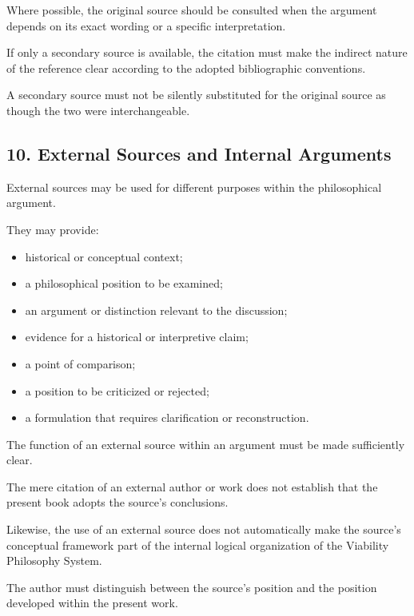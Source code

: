 Where possible, the original
source should be consulted
when the argument depends
on its exact wording or
a specific interpretation.

If only a secondary source
is available, the citation
must make the indirect
nature of the reference
clear according to the
adopted bibliographic
conventions.

A secondary source must
not be silently substituted
for the original source
as though the two were
interchangeable.


\subsection*{10. External Sources and Internal
Arguments}

External sources may be used
for different purposes within
the philosophical argument.

They may provide:

\begin{itemize}
    \item historical or conceptual
    context;
    \item a philosophical position
    to be examined;
    \item an argument or distinction
    relevant to the discussion;
    \item evidence for a historical
    or interpretive claim;
    \item a point of comparison;
    \item a position to be criticized
    or rejected;
    \item a formulation that
    requires clarification or
    reconstruction.
\end{itemize}

The function of an external
source within an argument
must be made sufficiently
clear.

The mere citation of an
external author or work
does not establish that
the present book adopts
the source's conclusions.

Likewise, the use of an
external source does not
automatically make the
source's conceptual framework
part of the internal logical
organization of the Viability
Philosophy System.

The author must distinguish
between the source's position
and the position developed
within the present work.

